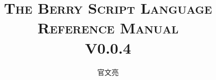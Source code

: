 
\newcommand\nbvspace[1][3]{\vspace*{\stretch{#1}}}
\newcommand\nbstretchyspace{\spaceskip0.5em plus 0.25em minus 0.25em}
\newcommand{\nbtitlestretch}{\spaceskip0.6em}

\newcommand{\cndash}{\raisebox{0.5mm}{------}}

\begin{titlepage}

    \title{\ebgaramond\Huge{\scshape The Berry Script Language\\Reference Manual}\\\Large{V0.0.4}}

    \author{官文亮}

    \maketitle

\end{titlepage}
